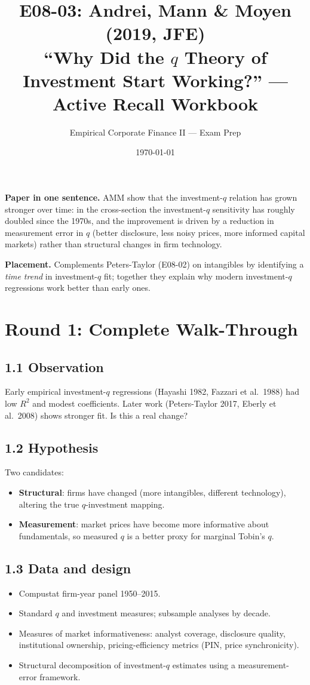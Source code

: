 \documentclass[11pt]{article}
\title{E08-03: Andrei, Mann \& Moyen (2019, JFE) \\
\large ``Why Did the $q$ Theory of Investment Start Working?'' --- Active Recall Workbook}
\author{Empirical Corporate Finance II --- Exam Prep}
\date{\today}
\begin{document}
\maketitle

\begin{keybox}
\textbf{Paper in one sentence.} AMM show that the investment-$q$ relation has grown stronger over time: in the cross-section the investment-$q$ sensitivity has roughly doubled since the 1970s, and the improvement is driven by a reduction in measurement error in $q$ (better disclosure, less noisy prices, more informed capital markets) rather than structural changes in firm technology.

\textbf{Placement.} Complements Peters-Taylor (E08-02) on intangibles by identifying a \emph{time trend} in investment-$q$ fit; together they explain why modern investment-$q$ regressions work better than early ones.
\end{keybox}

\section*{Round 1: Complete Walk-Through}

\subsection*{1.1 Observation}
Early empirical investment-$q$ regressions (Hayashi 1982, Fazzari et al.\ 1988) had low $R^2$ and modest coefficients. Later work (Peters-Taylor 2017, Eberly et al.\ 2008) shows stronger fit. Is this a real change?

\subsection*{1.2 Hypothesis}
Two candidates:
\begin{itemize}
\item \textbf{Structural}: firms have changed (more intangibles, different technology), altering the true $q$-investment mapping.
\item \textbf{Measurement}: market prices have become more informative about fundamentals, so measured $q$ is a better proxy for marginal Tobin's $q$.
\end{itemize}

\subsection*{1.3 Data and design}
\begin{itemize}
\item Compustat firm-year panel 1950--2015.
\item Standard $q$ and investment measures; subsample analyses by decade.
\item Measures of market informativeness: analyst coverage, disclosure quality, institutional ownership, pricing-efficiency metrics (PIN, price synchronicity).
\item Structural decomposition of investment-$q$ estimates using a measurement-error framework.
\end{itemize}
\end{document}
